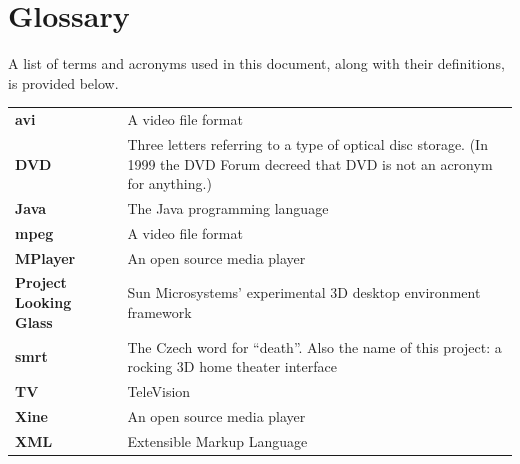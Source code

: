 \documentclass[letterpaper, titlepage, 11pt]{article}
\begin{document}
\pagebreak
\appendix

\section{Glossary}
A list of terms and acronyms used in this document, along with their
definitions, is provided below.

\begin{tabular}{p{.3\linewidth}p{.6\linewidth}}
	\textbf{avi}			& A video file format			\\
	\textbf{DVD}			& Three letters referring to a type of
					  optical disc storage. (In 1999 the DVD
					  Forum decreed that DVD is not an
					  acronym for anything.)		\\
	\textbf{Java}			& The Java programming language		\\
	\textbf{mpeg}			& A video file format			\\
	\textbf{MPlayer}		& An open source media player		\\
	\textbf{Project Looking Glass}	& Sun Microsystems' experimental 3D
					  desktop environment framework		\\
	\textbf{smrt}			& The Czech word for ``death''. Also the
					  name of this project: a rocking 3D
					  home theater interface		\\
	\textbf{TV}			& TeleVision				\\
	\textbf{Xine}			& An open source media player		\\
	\textbf{XML}			& Extensible Markup Language
\end{tabular}
\end{document}
